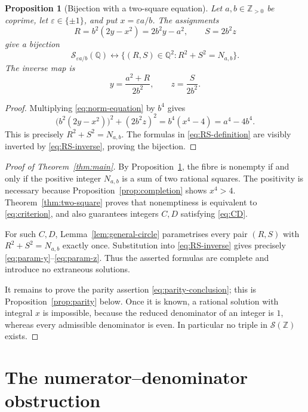 \documentclass[11pt]{article}
\numberwithin{equation}{section}
\newtheorem{proposition}[theorem]{Proposition}
\theoremstyle{definition}
\theoremstyle{remark}
\newcommand{\Q}{\mathbb{Q}}
\newcommand{\Z}{\mathbb{Z}}
\newcommand{\eps}{\varepsilon}
\begin{document}
\begin{proposition}[Bijection with a two-square equation]\label{prop:fibre-bijection}
Let $a,b\in\Z_{>0}$ be coprime, let $\eps\in\{\pm1\}$, and put
$x=\eps a/b$.  The assignments
\begin{equation}\label{eq:RS-definition}
 R=b^{2}(2y-x^{2})=2b^{2}y-a^{2},
 \qquad
 S=2b^{2}z
\end{equation}
give a bijection
\[
 \mathcal S_{\eps a/b}(\Q)
 \longleftrightarrow
 \{(R,S)\in\Q^{2}:R^{2}+S^{2}=N_{a,b}\}.
\]
The inverse map is
\begin{equation}\label{eq:RS-inverse}
 y=\frac{a^{2}+R}{2b^{2}},
 \qquad
 z=\frac{S}{2b^{2}}.
\end{equation}
\end{proposition}

\begin{proof}
Multiplying \eqref{eq:norm-equation} by $b^{4}$ gives
\[
 \bigl(b^{2}(2y-x^{2})\bigr)^{2}
 +(2b^{2}z)^{2}
 =b^{4}(x^{4}-4)=a^{4}-4b^{4}.
\]
This is precisely $R^{2}+S^{2}=N_{a,b}$.  The formulas in
\eqref{eq:RS-definition} are visibly inverted by
\eqref{eq:RS-inverse}, proving the bijection.
\end{proof}

\begin{proof}[Proof of Theorem~\ref{thm:main}]
By Proposition~\ref{prop:fibre-bijection}, the fibre is nonempty if and
only if the positive integer $N_{a,b}$ is a sum of two rational squares.
The positivity is necessary because Proposition~\ref{prop:completion}
shows $x^{4}>4$.  Theorem~\ref{thm:two-square} proves that nonemptiness is
equivalent to \eqref{eq:criterion}, and also guarantees integers $C,D$
satisfying \eqref{eq:CD}.

For such $C,D$, Lemma~\ref{lem:general-circle} parametrises every pair
$(R,S)$ with $R^{2}+S^{2}=N_{a,b}$ exactly once.  Substitution into
\eqref{eq:RS-inverse} gives precisely
\eqref{eq:param-y}--\eqref{eq:param-z}.  Thus the asserted formulas are
complete and introduce no extraneous solutions.

It remains to prove the parity assertion \eqref{eq:parity-conclusion};
this is Proposition~\ref{prop:parity} below.  Once it is known, a
rational solution with integral $x$ is impossible, because the reduced
denominator of an integer is $1$, whereas every admissible denominator
is even.  In particular no triple in $\mathcal S(\Z)$ exists.
\end{proof}

\section{The numerator--denominator obstruction}
\end{document}
